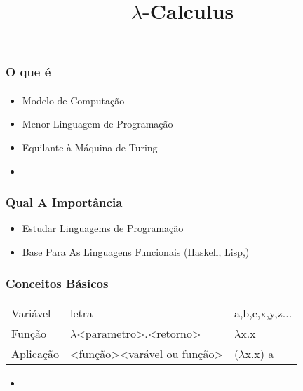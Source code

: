 \documentclass{beamer}
\begin{document}
\title{$\lambda$-Calculus}
\maketitle

\begin{frame}
  \frametitle{O que é}
  \framesubtitle{}

  \begin{itemize}
    \item Modelo de Computação
    \item Menor Linguagem de Programação
    \item Equilante à Máquina de Turing
    \item
  \end{itemize}
\end{frame}
\begin{frame}
  \frametitle{Qual A Importância}
  \begin{itemize}
    \item Estudar Linguagems de Programação
    \item Base Para As Linguagens Funcionais (Haskell, Lisp,)
  \end{itemize}
\end{frame}
\begin{frame}
  \frametitle{Conceitos Básicos}
\begin{tabular}{lll}
  Variável & letra & a,b,c,x,y,z...\\
  Função & $\lambda$<parametro>.<retorno> & $\lambda$x.x\\
  Aplicação & <função><varável ou função> &  ($\lambda$x.x) a\\
  \end{tabular}

  \begin{itemize}
    \item
\end{itemize}
\end{frame}
\end{document}
